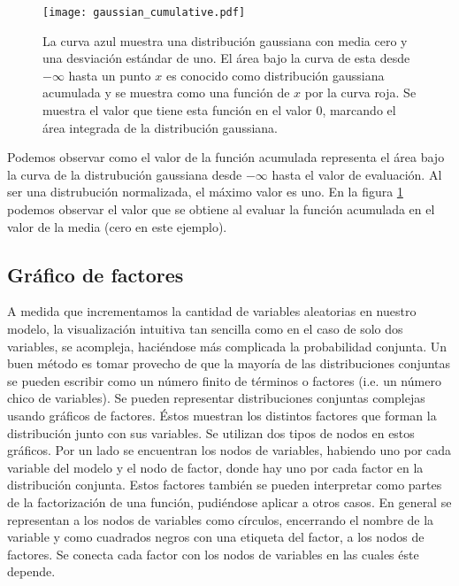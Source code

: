 \documentclass[11pt,twoside,spanish]{report} %
\begin{document}
\begin{figure}[H]
	\centering
	\texttt{[image: gaussian\_cumulative.pdf]}
	\caption{La curva azul muestra una distribuci\'on gaussiana con media cero y una desviaci\'on est\'andar de uno. El \'area bajo la curva de esta desde $-\infty$ hasta un punto $x$ es conocido como distribuci\'on gaussiana acumulada y se muestra como una funci\'on de $x$ por la curva roja. Se muestra el valor que tiene esta funci\'on en el valor 0, marcando el \'area integrada de la distribuci\'on gaussiana.}
	\label{fig:acumulativa}
\end{figure}


Podemos observar como el valor de la funci\'on acumulada representa el \'area bajo la curva de la distrubuci\'on gaussiana desde $-\infty$  hasta el valor de evaluaci\'on.
Al ser una distrubuci\'on normalizada, el m\'aximo valor es uno.
En la figura \ref{fig:acumulativa} podemos observar el valor que se obtiene al evaluar  la funci\'on acumulada en el valor de la media (cero en este ejemplo).

\subsection{Gr\'afico de factores}


A medida que incrementamos la cantidad de variables aleatorias en nuestro modelo, la visualizaci\'on intuitiva tan sencilla como en el caso de solo dos variables, se acompleja, haci\'endose m\'as complicada la probabilidad conjunta.
Un buen m\'etodo es tomar provecho  de que la mayor\'ia de las distribuciones conjuntas se pueden escribir como un n\'umero finito de t\'erminos o factores (i.e. un n\'umero chico de variables).
Se pueden representar distribuciones conjuntas complejas usando gr\'aficos de factores.
\'Estos muestran los distintos factores que forman la distribuci\'on junto con sus variables.
Se utilizan dos tipos de nodos en estos gr\'aficos.
Por un lado se encuentran los nodos de variables, habiendo uno por cada variable del modelo y el nodo de factor, donde hay uno por cada factor en la distribuci\'on conjunta.
Estos factores tambi\'en se pueden interpretar como partes de la factorizaci\'on de una funci\'on, pudi\'endose aplicar a otros casos.
En general se representan a los nodos de variables como c\'irculos, encerrando el nombre de la variable y como cuadrados negros con una etiqueta del factor, a los nodos de factores.
Se conecta cada factor con los nodos de variables en las cuales \'este depende.
\end{document}
